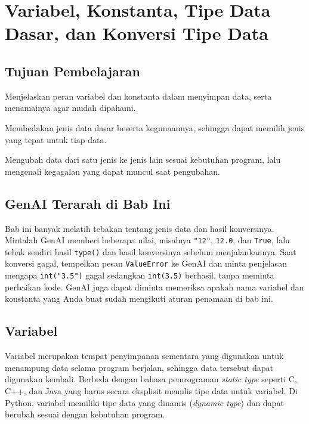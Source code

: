 \chapter{Variabel, Konstanta, Tipe Data Dasar, dan Konversi Tipe Data}

\section*{Tujuan Pembelajaran}
\begin{daftarrapat}
  \item Menjelaskan peran variabel dan konstanta dalam menyimpan data, serta menamainya agar mudah dipahami.
  \item Membedakan jenis data dasar beserta kegunaannya, sehingga dapat memilih jenis yang tepat untuk tiap data.
  \item Mengubah data dari satu jenis ke jenis lain sesuai kebutuhan program, lalu mengenali kegagalan yang dapat muncul saat pengubahan.
\end{daftarrapat}

\section*{GenAI Terarah di Bab Ini}

Bab ini banyak melatih tebakan tentang jenis data dan hasil konversinya. Mintalah GenAI memberi beberapa nilai, misalnya \texttt{"12"}, \texttt{12.0}, dan \texttt{True}, lalu tebak sendiri hasil \texttt{type()} dan hasil konversinya sebelum menjalankannya. Saat konversi gagal, tempelkan pesan \texttt{ValueError} ke GenAI dan minta penjelasan mengapa \texttt{int("3.5")} gagal sedangkan \texttt{int(3.5)} berhasil, tanpa meminta perbaikan kode. GenAI juga dapat diminta memeriksa apakah nama variabel dan konstanta yang Anda buat sudah mengikuti aturan penamaan di bab ini.

\section{Variabel}

Variabel merupakan tempat penyimpanan sementara yang digunakan untuk menampung data selama program berjalan, sehingga data tersebut dapat digunakan kembali. Berbeda dengan bahasa pemrograman \textit{static type} seperti C, C++, dan Java yang harus secara eksplisit menulis tipe data untuk variabel. Di Python, variabel memiliki tipe data yang dinamis (\textit{dynamic type}) dan dapat berubah sesuai dengan kebutuhan program.

